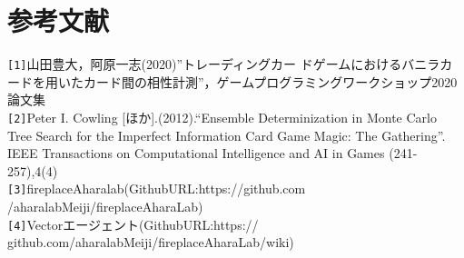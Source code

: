 \documentclass[twocolumn]{ltjsarticle}
\begin{document}
\section{
  参考文献
}
\small{
  \verb#[1]#山田豊大，阿原一志(2020)”トレーディングカー
  ドゲームにおけるバニラカードを用いたカード間の相性計測”，ゲームプログラミングワークショップ2020論文集
  \\
  \verb#[2]#Peter I. Cowling [ほか].(2012).“Ensemble
  Determinization in Monte Carlo Tree Search for the
  Imperfect Information Card Game Magic: The Gathering”.
  IEEE Transactions on Computational Intelligence and AI
  in Games (241-257),4(4)
  \\
  \verb#[3]#fireplaceAharalab(GithubURL:https://github.com
  /aharalabMeiji/fireplaceAharaLab)
  \\
  \verb#[4]#Vectorエージェント(GithubURL:https://
  github.com/aharalabMeiji/fireplaceAharaLab/wiki)
  

  
}

\end{document}
